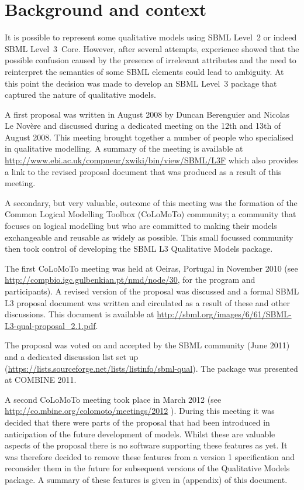 
\section{Background and context}
\label{background}

It is possible to represent some qualitative models using SBML Level~2 or indeed SBML Level~3~Core. However,  after several attempts, experience showed that the possible confusion caused by the presence of irrelevant attributes and the need to reinterpret the semantics of some SBML elements could lead to ambiguity. At this point the decision was made to develop an SBML Level~3 package that captured the nature of qualitative models.


A first proposal was written in August 2008 by Duncan Berenguier and Nicolas Le Nov\`ere and discussed during a dedicated meeting on the 12th and 13th of August 2008. This meeting brought together a number of people who specialised in qualitative modelling. A summary of the meeting is available at \url{http://www.ebi.ac.uk/compneur/xwiki/bin/view/SBML/L3F} which also provides a link to the revised proposal document that was produced as a result of this meeting.

A secondary, but very valuable, outcome of this meeting was the formation of the Common Logical Modelling Toolbox (CoLoMoTo) community; a community that focuses on logical modelling but who are committed to making their models exchangeable and reusable as widely as possible.  This small focussed community then took control of developing the SBML L3 Qualitative Models package.

The first CoLoMoTo meeting was held at Oeiras, Portugal in November 2010 (see \url{http://compbio.igc.gulbenkian.pt/nmd/node/30}, for the program and participants). A revised version of the proposal was discussed  and a formal SBML L3 proposal document was written and circulated as a result of these and other discussions.
This document is available at \url{http://sbml.org/images/6/61/SBML-L3-qual-proposal_2.1.pdf}.

The proposal was voted on and accepted by the SBML community (June 2011) and a dedicated discussion list set up (\url{https://lists.sourceforge.net/lists/listinfo/sbml-qual}). The package was presented at COMBINE 2011.

A second CoLoMoTo meeting took place in March 2012 (see \url{http://co.mbine.org/colomoto/meetings/2012} ). During this meeting it was decided that there were parts of the proposal that had been introduced in anticipation of the future development of models. Whilst these are valuable aspects of the proposal there is no software supporting these features as yet. It was therefore decided to remove these features from a version 1 specification and reconsider them in the future for subsequent versions of the Qualitative Models package. A summary of these features is given in  (appendix) of this document.


